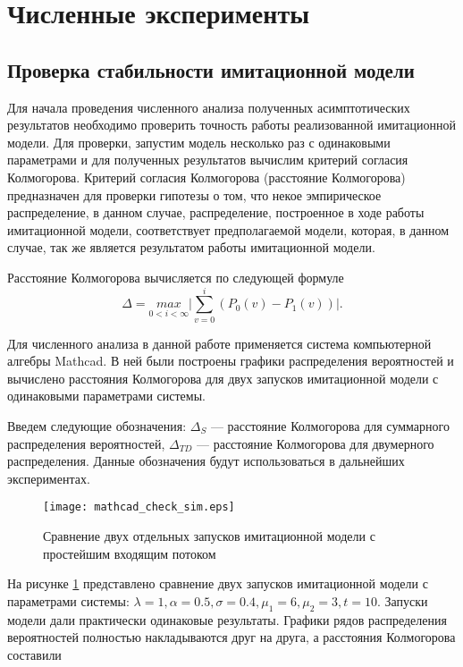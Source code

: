 \section{Численные эксперименты}
\subsection{Проверка стабильности имитационной модели}
Для начала проведения численного анализа полученных асимптотических результатов необходимо проверить точность работы реализованной имитационной модели. Для проверки, запустим модель несколько раз с одинаковыми параметрами и для полученных результатов вычислим критерий согласия Колмогорова. Критерий согласия Колмогорова (расстояние Колмогорова) предназначен для проверки гипотезы о том, что некое эмпирическое распределение, в данном случае, распределение, построенное в ходе работы имитационной модели, соответствует предполагаемой модели, которая, в данном случае, так же является результатом работы имитационной модели.

Расстояние Колмогорова вычисляется по следующей формуле
\begin{equation*}
	\Delta = \underset{0 < i < \infty}{max}\bigg\rvert \sum_{v=0}^{i} (P_0(v) - P_1(v))\bigg\rvert.
\end{equation*}

Для численного анализа в данной работе применяется система компьютерной алгебры Mathcad. В ней были построены графики распределения вероятностей и вычислено расстояния Колмогорова для двух запусков имитационной модели с одинаковыми параметрами системы.

Введем следующие обозначения: $\Delta_S$ --- расстояние Колмогорова для суммарного распределения вероятностей, $\Delta_{TD}$ --- расстояние Колмогорова для двумерного распределения. Данные обозначения будут использоваться в дальнейших экспериментах.

\begin{figure}[H]
	\centering
	\texttt{[image: mathcad\_check\_sim.eps]}
	\caption{Сравнение двух отдельных запусков имитационной модели с простейшим входящим потоком}
	\label{experiments_kol_dist_sim}
\end{figure} 

На рисунке \ref{experiments_kol_dist_sim} представлено сравнение двух запусков имитационной модели с параметрами системы: $\lambda = 1, \alpha = 0.5, \sigma = 0.4, \mu_{1} = 6, \mu_{2} = 3, t = 10 $. Запуски модели дали практически одинаковые результаты. Графики рядов распределения вероятностей полностью накладываются друг на друга, а расстояния Колмогорова составили

